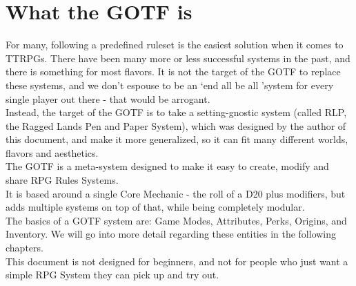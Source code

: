 \section{What the GOTF is}\label{sec:gotfexplanation}
For many, following a predefined ruleset is the easiest solution when it comes to TTRPGs.
There have been many more or less successful systems in the past, and there is something for most flavors.
It is not the target of the GOTF to replace these systems, and we don't espouse to be an \lq end all be all \rq system for every single player out there - that would be arrogant.\\
Instead, the target of the GOTF is to take a setting-gnostic system (called RLP, the Ragged Lands Pen and Paper System), which was designed by the author of this document, and make it more generalized, so it can fit many different worlds, flavors and aesthetics.\\
The GOTF is a meta-system designed to make it easy to create, modify and share RPG Rules Systems.\\
It is based around a single Core Mechanic - the roll of a D20 plus modifiers, but adds multiple systems on top of that, while being completely modular.\\
The basics of a GOTF system are: Game Modes, Attributes, Perks, Origins, and Inventory.
We will go into more detail regarding these entities in the following chapters.\\
This document is not designed for beginners, and not for people who just want a simple RPG System they can pick up and try out.